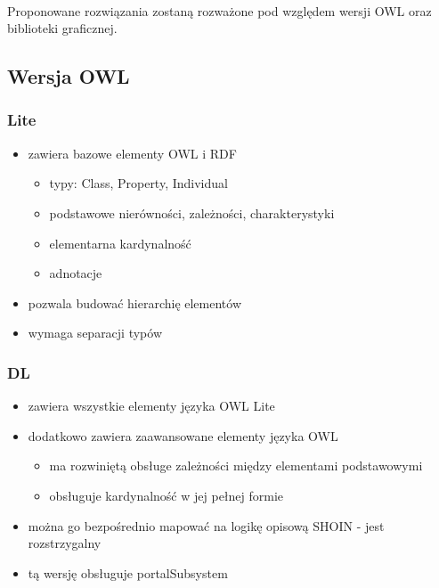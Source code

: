 \documentclass[a4paper,10pt]{article}
\begin{document}
\paragraph{} Proponowane rozwiązania zostaną rozważone pod względem wersji OWL oraz biblioteki graficznej. 

\subsection{Wersja OWL}

\subsubsection{Lite}
	\begin{itemize}
	 \item zawiera bazowe elementy OWL i RDF
		\begin{itemize}
 		\item typy: Class, Property, Individual
		\item podstawowe nierówności, zależności, charakterystyki
		\item elementarna kardynalność
		\item adnotacje
		\end{itemize}
	\item pozwala budować hierarchię elementów
	\item wymaga separacji typów
	\end{itemize}

\subsubsection{DL}
	\begin{itemize}
	\item zawiera wszystkie elementy języka OWL Lite 
	\item dodatkowo zawiera zaawansowane elementy języka OWL
		\begin{itemize}
 		\item ma rozwiniętą obsługe zależności między elementami podstawowymi
		\item obsługuje kardynalność w jej pełnej formie
		\end{itemize}
	\item można go bezpośrednio mapować na logikę opisową SHOIN - jest rozstrzygalny
	\item tą wersję obsługuje portalSubsystem
	\end{itemize}
\end{document}
